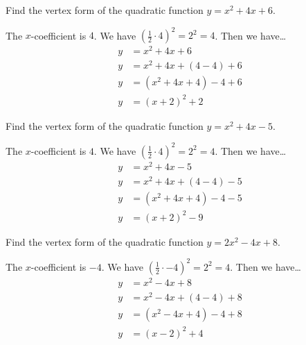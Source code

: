 \documentclass[11pt,letterpaper]{article}
\begin{document}

 Find the vertex form of the quadratic function $y= x^2 + 4x + 6$. \pspace

\sol The $x$-coefficient is $4$. We have $(\frac{1}{2} \cdot 4)^2= 2^2= 4$. Then we have\dots
	\[
	\begin{aligned}
	y&= x^2 + 4x + 6 \\[0.3cm]
	y&= x^2 + 4x + (4 - 4) + 6 \\[0.3cm]
	y&= (x^2 + 4x + 4) - 4 + 6 \\[0.3cm]
	y&= (x + 2)^2 + 2
	\end{aligned}
	\]





\newpage





 Find the vertex form of the quadratic function $y= x^2 + 4x - 5$. \pspace

\sol The $x$-coefficient is $4$. We have $(\frac{1}{2} \cdot 4)^2= 2^2= 4$. Then we have\dots
	\[
	\begin{aligned}
	y&= x^2 + 4x - 5 \\[0.3cm]
	y&= x^2 + 4x + (4 - 4) - 5 \\[0.3cm]
	y&= (x^2 + 4x + 4) - 4 - 5 \\[0.3cm]
	y&= (x + 2)^2 - 9
	\end{aligned}
	\]





\newpage





 Find the vertex form of the quadratic function $y= 2x^2 - 4x + 8$. \pspace

\sol The $x$-coefficient is $-4$. We have $(\frac{1}{2} \cdot -4)^2= 2^2= 4$. Then we have\dots
	\[
	\begin{aligned}
	y&= x^2 - 4x + 8 \\[0.3cm]
	y&= x^2 - 4x + (4 - 4) + 8 \\[0.3cm]
	y&= (x^2 - 4x + 4) - 4 + 8 \\[0.3cm]
	y&= (x - 2)^2 + 4
	\end{aligned}
	\]





\newpage
\end{document}
